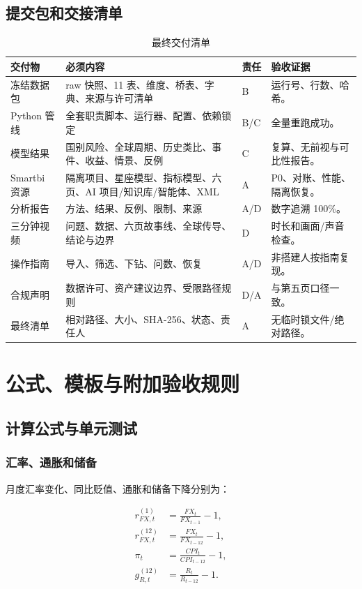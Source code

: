 \documentclass[UTF8,fontset=windows,12pt,openany]{ctexbook}
\begin{document}
\chapter{提交包和交接清单}

\begin{longtable}{p{4.2cm}p{4.3cm}p{2.5cm}p{3.2cm}}
\caption{最终交付清单}\label{tab:handoff}\\
\toprule
\textbf{交付物} & \textbf{必须内容} & \textbf{责任} & \textbf{验收证据}\\
\midrule
冻结数据包 & raw 快照、11 表、维度、桥表、字典、来源与许可清单 & B & 运行号、行数、哈希。\\
Python 管线 & 全套职责脚本、运行器、配置、依赖锁定 & B/C & 全量重跑成功。\\
模型结果 & 国别风险、全球周期、历史类比、事件、收益、情景、反例 & C & 复算、无前视与可比性报告。\\
Smartbi 资源 & 隔离项目、星座模型、指标模型、六页、AI 项目/知识库/智能体、XML & A & P0、对账、性能、隔离恢复。\\
分析报告 & 方法、结果、反例、限制、来源 & A/D & 数字追溯 100\%。\\
三分钟视频 & 问题、数据、六页故事线、全球传导、结论与边界 & D & 时长和画面/声音检查。\\
操作指南 & 导入、筛选、下钻、问数、恢复 & A/D & 非搭建人按指南复现。\\
合规声明 & 数据许可、资产建议边界、受限路径规则 & D/A & 与第五页口径一致。\\
最终清单 & 相对路径、大小、SHA-256、状态、责任人 & A & 无临时锁文件/绝对路径。\\
\bottomrule
\end{longtable}

\part{公式、模板与附加验收规则}

\chapter{计算公式与单元测试}

\section{汇率、通胀和储备}

月度汇率变化、同比贬值、通胀和储备下降分别为：

\begin{align}
r_{FX,t}^{(1)} &= \frac{FX_t}{FX_{t-1}}-1,\\
r_{FX,t}^{(12)} &= \frac{FX_t}{FX_{t-12}}-1,\\
\pi_t &= \frac{CPI_t}{CPI_{t-12}}-1,\\
g_{R,t}^{(12)} &= \frac{R_t}{R_{t-12}}-1.
\end{align}
\end{document}
